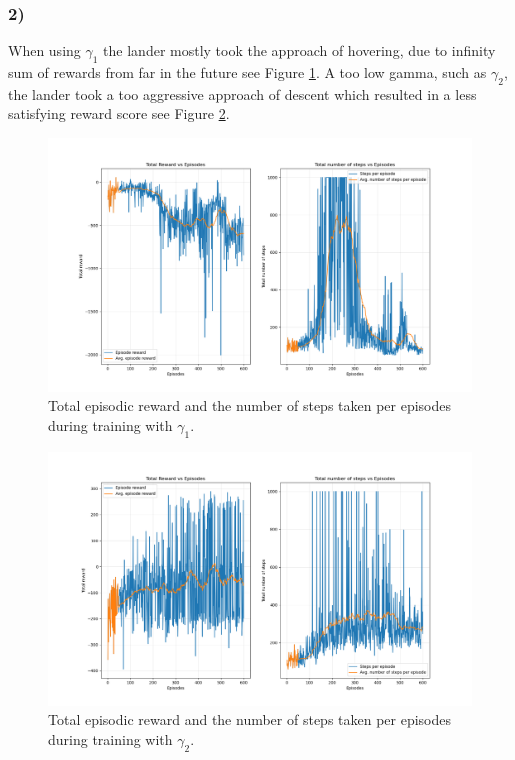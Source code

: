\documentclass{article}
\begin{document}
\subsubsection*{2)}
 When using $\gamma_1$ the lander mostly took the approach of hovering, due to infinity sum of rewards from far in the future see Figure \ref{fig:gamma1}. A too low gamma, such as $\gamma_2$, the lander took a too aggressive approach of descent which resulted in a less satisfying reward score see Figure \ref{fig:gamma0.2}.
\begin{figure}[H]
    \centering
    \includegraphics[width=1\textwidth]{Lab_2/problem1/images/gamma_1.png}
    \caption{\small Total episodic reward and the number of steps taken per episodes during training with $\gamma_1$.  }
    \label{fig:gamma1}
\end{figure}

\begin{figure}[H]
    \centering
    \includegraphics[width=1\textwidth]{Lab_2/problem1/images/gamma_02.png}
    \caption{\small Total episodic reward and the number of steps taken per episodes during training with $\gamma_2$. }
    \label{fig:gamma0.2}
\end{figure}
\end{document}
